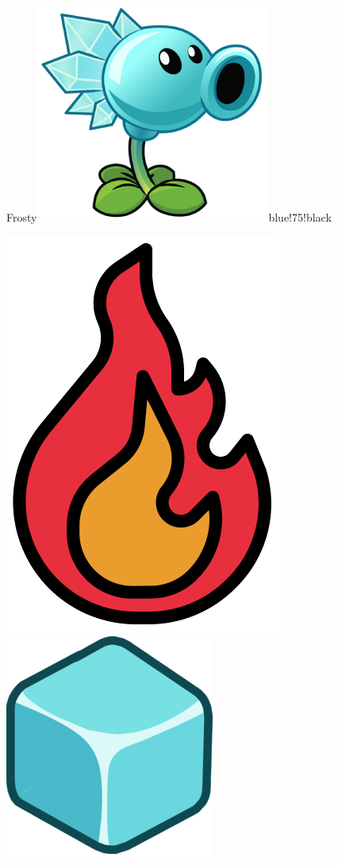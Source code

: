 \documentclass[11pt, a5paper]{article}
\def\now{\hspace{0.2cm}}
\begin{document}
\begin{mybox}{Frosty}{\includegraphics[scale=0.1]{frosty}}{blue!75!black}
\begin{minipage}[t]{\textwidth}
			\now\includegraphics[scale=0.075]{firef} 
			\now\includegraphics[scale=0.3]{icei} 
		\end{minipage}
	\end{mybox}
	
\end{document}
